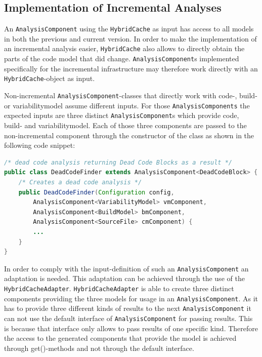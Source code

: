 \documentclass[a4paper]{article}
\begin{document}
\subsection{Implementation of Incremental Analyses}\label{incremental-analyses}

An \texttt{Analysis\-Component} using the \texttt{Hybrid\-Cache} as input has access to all models in both the previous and current version. In order to make the implementation of an incremental analysis easier, \texttt{Hybrid\-Cache} also allows to directly obtain the parts of the code model that did change. \texttt{Analysis\-Component}s implemented specifically for the incremental infrastructure may therefore work directly with an \texttt{Hybrid\-Cache}-object as input. 

Non-incremental \texttt{Analysis\-Component}-classes that directly work with code-, build- or variabilitymodel assume different inputs. For those \texttt{AnalysisComponents} the expected inputs are three distinct \texttt{Analysis\-Component}s which provide code, build- and variabilitymodel. Each of those three components are passed to the non-incremental component through the constructor of the class as shown in the following code snippet:

\begin{lstlisting}[language=java]
/* dead code analysis returning Dead Code Blocks as a result */
public class DeadCodeFinder extends AnalysisComponent<DeadCodeBlock> {
    /* Creates a dead code analysis */
    public DeadCodeFinder(Configuration config, 
        AnalysisComponent<VariabilityModel> vmComponent, 
        AnalysisComponent<BuildModel> bmComponent, 
        AnalysisComponent<SourceFile> cmComponent) {
        ...
    }
}
\end{lstlisting}

In order to comply with the input-definition of such an \texttt{Analysis\-Component} an adaptation is needed. This adaptation can be achieved through the use of the \texttt{Hybrid\-Cache\-Adapter}. \texttt{Hybrid\-Cache\-Adapter} is able to create three distinct components providing the three models for usage in an \texttt{Analysis\-Component}. As it has to provide three different kinds of results to the next \texttt{Analysis\-Component} it can not use the default interface of \texttt{Analysis\-Component} for passing results. This is because that interface only allows to pass results of one specific kind. Therefore the access to the generated components that provide the model is achieved through get()-methods and not through the default interface. 
\end{document}

